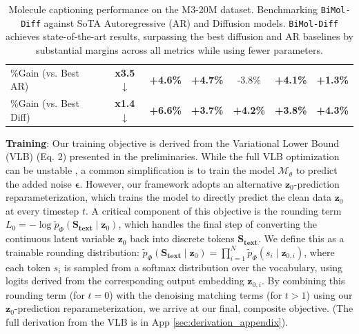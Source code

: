\begin{table}[t!]
{\begin{tabular}{l c c c c c c}
        \rowcolor{white!70!gray}
        \%Gain (vs. Best AR) & \textbf{x3.5$\downarrow$} & \textbf{+4.6\%} & \textbf{+4.7\%} & -3.8\% & \textbf{+4.1\%} & \textbf{+1.3\%} \\
        \rowcolor{white!70!gray}
        \%Gain (vs. Best Diff) & \textbf{x1.4$\downarrow$} & \textbf{+6.6\%} & \textbf{+3.7\%} & \textbf{+4.2\%} & \textbf{+3.8\%} & \textbf{+4.3\%} \\
        \bottomrule
    \end{tabular}%
    }
    \caption{Molecule captioning performance on the M3-20M dataset. Benchmarking \texttt{BiMol-Diff} against SoTA Autoregressive (AR) and Diffusion models. \texttt{BiMol-Diff} achieves state-of-the-art results, surpassing the best diffusion and AR baselines by substantial margins across all metrics while using fewer parameters.}
    \label{molecule captioning}
    \vspace{-3mm}
\end{table}



\noindent \textbf{Training}: Our training objective is derived from the Variational Lower Bound (VLB) (Eq. 2) presented in the preliminaries. While the full VLB optimization can be unstable \citep{ho2020denoisingdiffusionprobabilisticmodels}, 
a common simplification is to train the model $\mathcal{M}_\theta$ to predict the added noise $\boldsymbol{\epsilon}$. However, our framework adopts an alternative $\mathbf{z}_0$-prediction reparameterization, which trains the model to directly predict the clean data $\mathbf{z}_0$ at every timestep $t$.
A critical component of this objective is the rounding term $L_0 = -\log \tilde{p}_\Phi(\mathbf{S_{text}} \mid \mathbf{z}_0)$, which handles the final step of converting the continuous latent variable $\mathbf{z}_0$ back into discrete tokens $\mathbf{S_{text}}$. We define this as a trainable rounding distribution: $\tilde{p}_\Phi(\mathbf{S_{text}} \mid \mathbf{z}_0) = \prod_{i=1}^{N} \tilde{p}_\Phi(s_i \mid \mathbf{z}_{0,i})$,
where each token $s_i$ is sampled from a softmax distribution over the vocabulary, using logits derived from the corresponding output embedding $\mathbf{z}_{0,i}$.
By combining this rounding term (for $t=0$) with the denoising matching terms (for $t>1$) using our $\mathbf{z}_0$-prediction reparameterization, we arrive at our final, composite objective. (The full derivation from the VLB is in App \ref{sec:derivation_appendix}).

